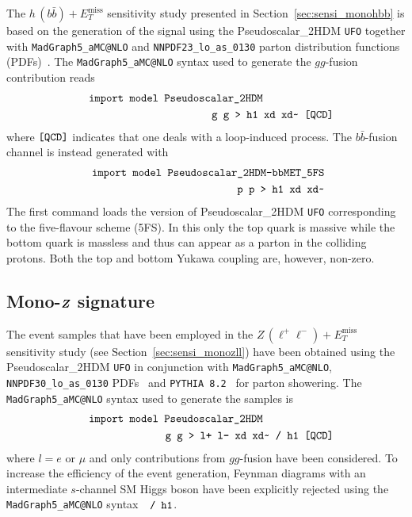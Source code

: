 \documentclass[a4paper, 11pt,notoc]{article}
\newcommand{\MET}{\ensuremath{E_T^\mathrm{miss}}\xspace}
\def\bm#1{\mbox{\boldmath$#1$\unboldmath}}
\begin{document}
The $h \, (b \bar b) + \MET$ sensitivity study presented in Section~\ref{sec:sensi_monohbb} is based on the generation of the signal using the Pseudoscalar\_2HDM {\tt UFO} together with {\tt MadGraph5\_aMC@NLO} and {\tt NNPDF23\_lo\_as\_0130} parton distribution functions (PDFs)~\cite{Ball:2012cx}. The {\tt MadGraph5\_aMC@NLO}  syntax used to generate the $gg$-fusion contribution reads 
\begin{eqnarray}
&& \verb| import model Pseudoscalar_2HDM | \hspace{2.25cm} \nonumber \\
&& \verb| g g > h1 xd xd~ [QCD] | \nonumber 
\end{eqnarray}
where  $\verb|[QCD]|$ indicates that one deals with a loop-induced process. The $b \bar b$-fusion channel is instead generated with 
\begin{eqnarray}
&& \verb| import model Pseudoscalar_2HDM-bbMET_5FS  | \nonumber \\
&& \verb| p p > h1 xd xd~  | \nonumber 
\end{eqnarray}
The first command loads the version of Pseudoscalar\_2HDM {\tt UFO}  corresponding to the five-flavour scheme (5FS). In this only the top quark is massive while the bottom quark is massless and thus 
can appear as a parton in the colliding protons. Both the top and bottom Yukawa coupling  are, however, non-zero.

\subsection*{Mono-$\bm{Z}$ signature}

The event samples that have been employed in the $Z \, (\ell^+ \ell^-) + \MET$ sensitivity study (see Section~\ref{sec:sensi_monozll}) have been obtained using the Pseudoscalar\_2HDM {\tt UFO} in conjunction with {\tt MadGraph5\_aMC@NLO}, {\tt NNPDF30\_lo\_as\_0130} PDFs~\cite{Ball:2014uwa} and  {\tt PYTHIA~8.2}~\cite{Sjostrand:2014zea} for parton showering.  The {\tt MadGraph5\_aMC@NLO}  syntax used to generate the samples is 
\begin{eqnarray}
&& \verb| import model Pseudoscalar_2HDM | \hspace{2.25cm} \nonumber \\
&& \verb| g g > l+ l- xd xd~ / h1 [QCD] | \nonumber 
\end{eqnarray}
where $l = e$ or $\mu$ and only contributions from $gg$-fusion have been considered.  To increase the efficiency of the event generation, Feynman diagrams with an intermediate $s$-channel SM Higgs boson have been explicitly rejected using the  {\tt MadGraph5\_aMC@NLO} syntax~~$\verb|/ h1|$.
\end{document}
